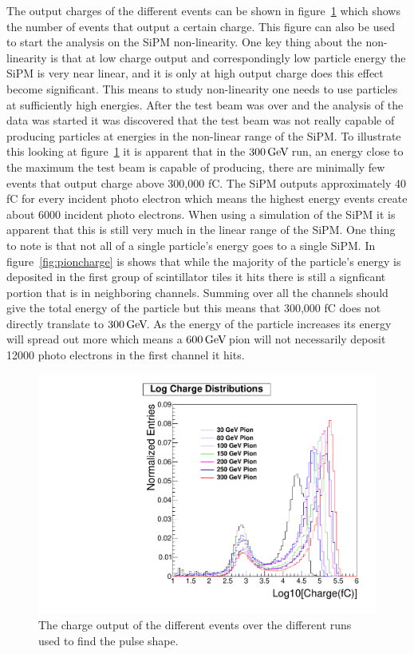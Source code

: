 The output charges of the different events can be shown in figure~\ref{fig:Log} which shows the number of events that output a certain charge. This figure can also be used to start the analysis on the SiPM non-linearity. One key thing about the non-linearity is that at low charge output and correspondingly low particle energy the SiPM is very near linear, and it is only at high output charge does this effect become significant. This means to study non-linearity one needs to use particles at sufficiently high energies. After the test beam was over and the analysis of the data was started it was discovered that the test beam was not really capable of producing particles at energies in the non-linear range of the SiPM. To illustrate this looking at figure~\ref{fig:Log} it is apparent that in the $300{\,\text{Ge\hspace{-.08em}V\hspace{-0.16em}}}$ run, an energy close to the maximum the test beam is capable of producing, there are minimally few events that output charge above 300,000 fC. The SiPM outputs approximately 40 fC for every incident photo electron which means the highest energy events create about 6000 incident photo electrons. When using a simulation of the SiPM it is apparent that this is still very much in the linear range of the SiPM. One thing to note is that not all of a single particle's energy goes to a single SiPM. In figure~\ref{fig:pioncharge} is shows that while the majority of the particle's energy is deposited in the first group of scintillator tiles it hits there is still a signficant portion that is in neighboring channels. Summing over all the channels should give the total energy of the particle but this means that 300,000 fC does not directly translate to $300{\,\text{Ge\hspace{-.08em}V\hspace{-0.16em}}}$. As the energy of the particle increases its energy will spread out more which means a $600{\,\text{Ge\hspace{-.08em}V\hspace{-0.16em}}}$ pion will not necessarily deposit 12000 photo electrons in the first channel it hits.

\begin{figure}
\centering
\includegraphics[width=0.7\linewidth]{Figures/Logplot.pdf}
\caption{The charge output of the different events over the different runs used to find the pulse shape.}
\label{fig:Log}
\end{figure}

